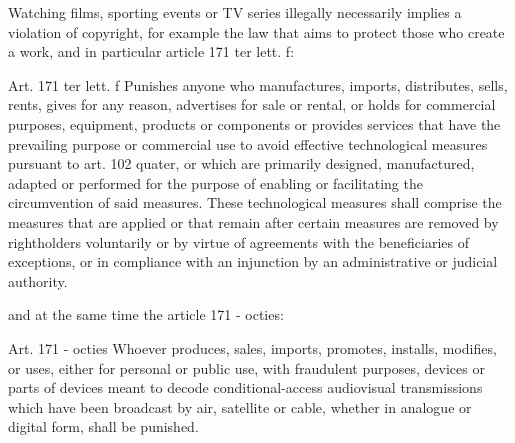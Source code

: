 \documentclass{article}
\begin{document}
\hfill \break
Watching films, sporting events or TV series illegally necessarily implies a violation of 
copyright, for example the law that aims to protect those who create a work, and in particular 
article 171 ter lett. f: 
\begin{my theorem}{Art. 171 ter lett. f}
  Punishes anyone who manufactures, imports, distributes, sells, rents, 
  gives for any reason, advertises for sale or rental, or holds for commercial purposes, equipment, 
  products or components or provides services that have the prevailing purpose or commercial use to 
  avoid effective technological measures pursuant to art. 102 quater, or which are primarily designed,
  manufactured, adapted or performed for the purpose of enabling or facilitating the circumvention 
  of said measures. These technological measures shall comprise the measures that are applied or 
  that remain after certain measures are removed by rightholders voluntarily or by virtue of 
  agreements with the beneficiaries of exceptions, or in compliance with an injunction by 
  an administrative or judicial authority.
\end{my theorem}

and at the same time the article 171 - octies:
\begin{my theorem}{Art. 171 - octies}
  Whoever produces, sales, imports, promotes, installs, modifies, or uses, either 
  for personal or public use, with fraudulent purposes, devices or parts of devices 
  meant to decode conditional-access audiovisual transmissions which have been broadcast 
  by air, satellite or cable, whether in analogue or digital form, shall be punished.
\end{my theorem}
\end{document}
